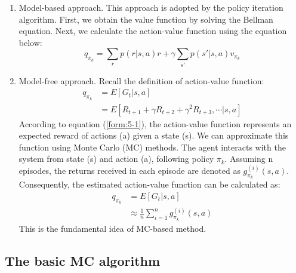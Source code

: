   \begin{enumerate}

    \item
          Model-based approach. This approach is adopted by the policy iteration algorithm. First, we obtain the value function by solving the Bellman equation.
          Next, we calculate the action-value function using the equation below:
          \begin{equation*}
            q_{\pi_{k}}=\sum_{r}p(r|s,a)r+\gamma \sum_{s'}p(s'|s,a)v_{\pi_{k}}
          \end{equation*}

    \item
          Model-free approach. Recall the definition of action-value function:
          \begin{align*}
            q_{\pi_{k}} & = E[G_{t}|s,a]                                           \\
                        & = E[R_{t+1}+\gamma R_{t+2}+\gamma^{2}R_{t+3},\cdots|s,a]
          \end{align*}
          According to equation (\ref{form:5-1}), the action-value function represents an expected reward of actions (a) given a state (s). We can approximate this
          function using Monte Carlo (MC) methods. The agent interacts with the system from state (s) and action (a), following policy $\pi_{k}$. Assuming n
          episodes, the returns received in each episode are denoted as $g_{\pi_{k}}^{(i)}(s, a)$. Consequently, the estimated action-value function can be
          calculated as:
          \begin{align*}
            q_{\pi_{k}} & = E[G_{t}|s,a]                                          \\
                        & \approx \frac{1}{n}\sum_{i=1}^{n}g_{\pi_{k}}^{(i)}(s,a)
          \end{align*}
          This is the fundamental idea of MC-based method.
  \end{enumerate}

  \subsection{The basic MC algorithm}

